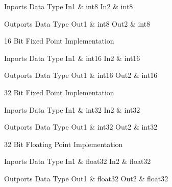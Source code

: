 \begin{XtoCtabular}{Inports Data Type}
In1 & int8\tabularnewline
\hline
In2 & int8\tabularnewline
\hline
\end{XtoCtabular}

\begin{XtoCtabular}{Outports Data Type}
Out1 & int8\tabularnewline
\hline
Out2 & int8\tabularnewline
\hline
\end{XtoCtabular}

\ifdefined \AddTestReports
{}
\fi
{}
\nopagebreak[0]

16 Bit Fixed Point Implementation

\begin{XtoCtabular}{Inports Data Type}
In1 & int16\tabularnewline
\hline
In2 & int16\tabularnewline
\hline
\end{XtoCtabular}

\begin{XtoCtabular}{Outports Data Type}
Out1 & int16\tabularnewline
\hline
Out2 & int16\tabularnewline
\hline
\end{XtoCtabular}

\ifdefined \AddTestReports
{}
\fi
{}
\nopagebreak[0]

32 Bit Fixed Point Implementation

\begin{XtoCtabular}{Inports Data Type}
In1 & int32\tabularnewline
\hline
In2 & int32\tabularnewline
\hline
\end{XtoCtabular}

\begin{XtoCtabular}{Outports Data Type}
Out1 & int32\tabularnewline
\hline
Out2 & int32\tabularnewline
\hline
\end{XtoCtabular}

\ifdefined \AddTestReports
{}
\fi
{}
\nopagebreak[0]

32 Bit Floating Point Implementation

\begin{XtoCtabular}{Inports Data Type}
In1 & float32\tabularnewline
\hline
In2 & float32\tabularnewline
\hline
\end{XtoCtabular}

\begin{XtoCtabular}{Outports Data Type}
Out1 & float32\tabularnewline
\hline
Out2 & float32\tabularnewline
\hline
\end{XtoCtabular}

